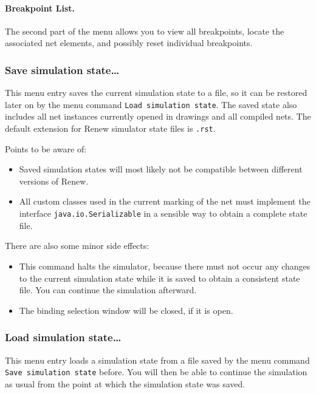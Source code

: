 \paragraph{Breakpoint List.}

The second part of the menu allows you to view all breakpoints,
locate the associated net elements, and possibly reset individual
breakpoints.


\subsubsection{Save simulation state\dots{}}

This menu entry saves the current simulation state to a file,
so it can be restored later on by the menu command
\texttt{Load simulation state}.
The saved state also includes all net instances currently
opened in drawings and all compiled nets.
The default extension for Renew simulator state files is
\texttt{.rst}.

Points to be aware of:
\begin{itemize}
\item Saved simulation states will most likely not be compatible
      between different versions of Renew.
\item All custom classes used in the current marking of the net
      must implement the interface \texttt{java.io.Serializable}
      in a sensible way to obtain a complete state file.
\end{itemize}

There are also some minor side effects:
\begin{itemize}
\item This command halts the simulator, because there must not
      occur any changes to the current simulation state while it
      is saved to obtain a consistent state file. You can continue
      the simulation afterward.
\item The binding selection window will be closed, if it is
      open.
\end{itemize}

\subsubsection{Load simulation state\dots{}}

This menu entry loads a simulation state from a file
saved by the menu command \texttt{Save simulation state}
before.
You will then be able to continue the simulation as usual
from the point at which the simulation state was saved.

